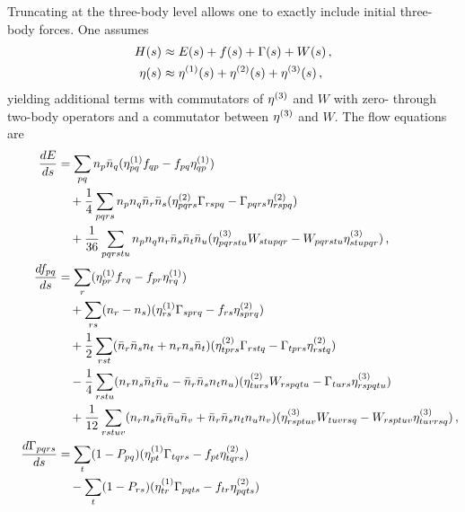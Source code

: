 Truncating at the three-body level allows one to exactly include initial three-body forces.
One assumes
\begin{align}
  H(s) &\approx E(s) + f(s) + \Gamma(s) + W(s)\,,\\
  \eta(s) &\approx \eta^{(1)}(s) + \eta^{(2)}(s) + \eta^{(3)}(s)\,,
\end{align}
yielding additional terms with commutators of $\eta^{(3)}$ and $W$
with zero- through two-body operators
and a commutator between $\eta^{(3)}$ and $W$.
The flow equations are
\begin{align}
  \phantom{\frac{dW_{pqrstu}}{ds}}
  &\begin{aligned}
    \mathllap{\frac{dE}{ds}} &= \sum_{pq} n_{p} \bar{n}_{q}
    (\genone_{pq} f_{qp} - f_{pq} \genone_{qp})\\
    &\quad + \frac{1}{4} \sum_{pqrs} n_{p}n_{q}\bar{n}_r \bar{n}_s
    (\gentwo_{pqrs} \Gamma_{rspq} - \Gamma_{pqrs}\gentwo_{rspq})\\
    &\quad + \frac{1}{36}\sum_{pqrstu} n_p n_q n_r \bar{n}_s \bar{n}_t \bar{n}_u
    (\genthree_{pqrstu} W_{stupqr} - W_{pqrstu} \genthree_{stupqr})\,,
  \end{aligned}\label{eq:imsrg3_0body}\\
  &\begin{aligned}
    \mathllap{\frac{df_{pq}}{ds}} &=
    \sum_{r}(\genone_{pr} f_{rq} - f_{pr} \genone_{rq}) \\
    &\quad+\sum_{rs}(n_r - n_s)(\genone_{rs}\Gamma_{sprq} - f_{rs}\gentwo_{sprq}) \\
    &\quad+\frac{1}{2}\sum_{rst}(\bar{n}_r \bar{n}_s n_t + n_r n_s \bar{n}_t)
    (\gentwo_{tprs} \Gamma_{rstq} - \Gamma_{tprs} \gentwo_{rstq}) \\
    &\quad - \frac{1}{4} \sum_{rstu}(n_r n_s \bar{n}_t \bar{n}_u -\bar{n}_r \bar{n}_s n_t n_u)
    (\gentwo_{turs} W_{rspqtu} - \Gamma_{turs} \genthree_{rspqtu}) \\
    &\quad + \frac{1}{12}\sum_{rstuv}
             (n_r n_s \bar{n}_t \bar{n}_u \bar{n}_v + \bar{n}_r \bar{n}_s n_t n_u n_v)
             (\genthree_{rsptuv} W_{tuvrsq} - W_{rsptuv} \genthree_{tuvrsq})\,,
  \end{aligned}\\
  &\begin{aligned}
    \mathllap{\frac{d\Gamma_{pqrs}}{ds}} &=
    \sum_{t}(1 - P_{pq})(\genone_{pt}\Gamma_{tqrs} - f_{pt}\gentwo_{tqrs}) \\
    &\quad - \sum_{t}(1 - P_{rs})(\genone_{tr}\Gamma_{pqts} - f_{tr}\gentwo_{pqts}) \\

\end{aligned}
\end{align}
